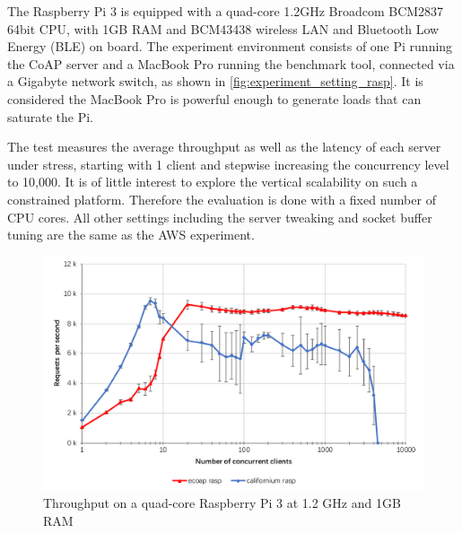 The Raspberry Pi 3 is equipped with a quad-core 1.2GHz Broadcom BCM2837 64bit CPU, with 1GB RAM and BCM43438 wireless LAN and Bluetooth Low Energy (BLE) on board. The experiment environment consists of one Pi running the CoAP server and a MacBook Pro running the benchmark tool, connected via a Gigabyte network switch, as shown in \autoref{fig:experiment_setting_rasp}. It is considered the MacBook Pro is powerful enough to generate loads that can saturate the Pi. 

The test measures the average throughput as well as the latency of each server under stress, starting with 1 client and stepwise increasing the concurrency level to 10,000. It is of little interest to explore the vertical scalability on such a constrained platform. Therefore the evaluation is done with a fixed number of CPU cores. All other settings including the server tweaking and socket buffer tuning are the same as the AWS experiment.

\begin{figure}[!htbp]
\centering
\includegraphics[scale = 0.7]{throughput_rasp}
\caption{Throughput on a quad-core Raspberry Pi 3 at 1.2 GHz and 1GB RAM}
\label{fig:throughput_rasp}
\end{figure}

